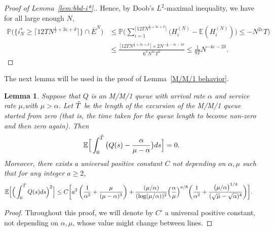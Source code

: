 \documentclass[11pt, reqno]{article}
\newtheorem{lemma}[theorem]{Lemma}
\numberwithin{equation}{section}
\numberwithin{theorem}{section}
\begin{document}
\begin{appendix}
\begin{proof}[Proof of Lemma~\ref{lem:bbd-i*}.]
Hence, by Doob's $L^2$-maximal inequality, we have for all large enough $N$,
\begin{align*}
    \mathbb{P}\Big(\big\{i^*_N\geq \lceil12TN^{\frac{1}{2}+3\varepsilon+\delta}\rceil\big\}\cap \bar{E}^{N}\Big)&\leq\mathbb{P}\Big(\sum_{i=1}^{\lceil 12TN^{\frac{1}{2}+3\varepsilon+\delta}\rceil}\big(H^{(N)}_i-\mathbb{E}(H^{(N)}_i)\big)\leq -N^{2\varepsilon}T\Big)\\
    &\leq \frac{\lceil 12TN^{\frac{1}{2}+3\varepsilon+\delta}\rceil\times 2N^{-\frac{1}{2}-3\varepsilon-3\delta}}{6^3 N^{4\varepsilon}T^2} \le \frac{1}{9T}N^{-4\varepsilon-2\delta}.
\end{align*}
\end{proof}




The next lemma will be used in the proof of Lemma~\ref{M/M/1 behavior}.
\begin{lemma}\label{EC19}
Suppose that  $Q$ is an M/M/1 queue with arrival rate $\alpha$ and service rate $\mu$,with $\mu>\alpha$. Let $\Tilde{T}$ be the length of the excursion of the M/M/1 queue started from zero (that is, the time taken for the queue length to become non-zero and then zero again). Then 
\begin{equation}\label{e1}
\mathbb{E}\Big[\int_0^{\Tilde{T}}\big(Q(s)-\frac{\alpha}{\mu-\alpha}\big)ds\Big]=0.
\end{equation}
Moreover, there exists a universal positive constant $C$ not depending on $\alpha, \mu$ such that for any integer $a \ge 2$,
\begin{equation}\label{e2}
\begin{split}
    \mathbb{E}\Big[\Big(\int_0^{\Tilde{T}}Q(s)ds\Big)^2\Big] 
\le C\bigg[ a^2 \left(\frac{1}{\alpha^2} + \frac{\mu}{(\mu - \alpha)^3}\right) &+ \frac{(\mu/\alpha)}{(\log(\mu/\alpha))^2}  \Big(\frac{\alpha}{\mu}\Big)^{a/8}
\bigg(\frac{1}{\alpha^2} +\frac{\big(\mu/\alpha\big)^{1/4}}{(\sqrt{\mu} - \sqrt{\alpha})^4}\bigg)\bigg].
\end{split}
\end{equation}
\end{lemma}

\begin{proof}
Throughout this proof, we will denote by $C'$ a universal positive constant, not depending on $\alpha, \mu$, whose value might change between lines.


\end{proof}
\end{appendix}
\end{document}

